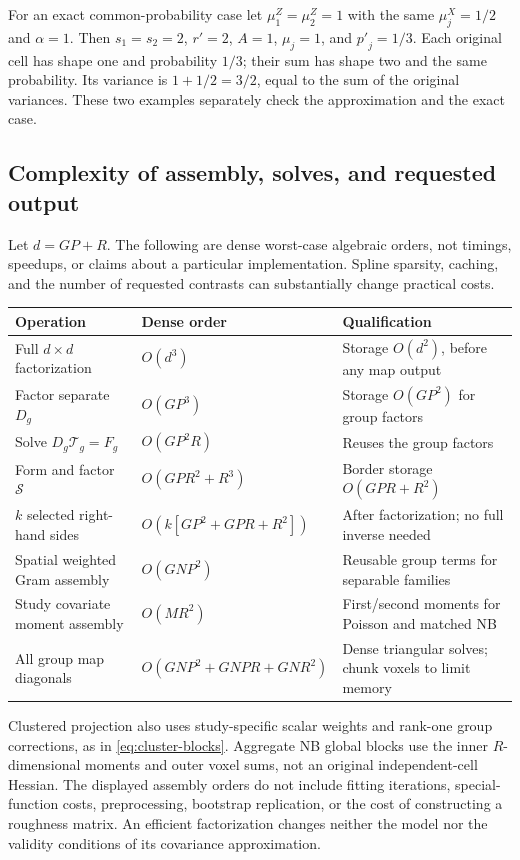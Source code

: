 \documentclass[11pt,a4paper]{article}
\numberwithin{equation}{section}
\begin{document}
For an exact common-probability case let $\mu_1^Z=\mu_2^Z=1$ with the same
$\mu_j^X=1/2$ and $\alpha=1$.
Then $s_1=s_2=2$, ${r'}=2$, $A=1$, ${\mu_j}=1$, and ${p'}_j=1/3$.
Each original cell has shape one and probability $1/3$;
their sum has shape two and the same probability.
Its variance is $1+1/2=3/2$, equal to the sum of the original variances.
These two examples separately check the approximation and the exact case.

\subsection{Complexity of assembly, solves, and requested output}
Let $d=GP+R$. The following are dense worst-case algebraic orders,
not timings, speedups, or claims about a particular implementation.
Spline sparsity, caching, and the number of requested contrasts can
substantially change practical costs.
\begin{center}\small
\begin{tabularx}{\textwidth}{T l T}
\toprule
Operation & Dense order & Qualification\\
\midrule
Full $d\times d$ factorization & $O(d^3)$ &
Storage $O(d^2)$, before any map output\\
Factor separate $D_g$ & $O(GP^3)$ &
Storage $O(GP^2)$ for group factors\\
Solve $D_g\mathcal T_g=F_g$ & $O(GP^2R)$ &
Reuses the group factors\\
Form and factor ${\mathcal S}$ & $O(GPR^2+R^3)$ &
Border storage $O(GPR+R^2)$\\
$k$ selected right-hand sides & $O(k[GP^2+GPR+R^2])$ &
After factorization; no full inverse needed\\
Spatial weighted Gram assembly & $O(GNP^2)$ &
Reusable group terms for separable families\\
Study covariate moment assembly & $O(MR^2)$ &
First/second moments for Poisson and matched NB\\
All group map diagonals & $O(GNP^2+GNPR+GNR^2)$ &
Dense triangular solves; chunk voxels to limit memory\\
\bottomrule
\end{tabularx}
\end{center}
Clustered projection also uses study-specific scalar weights and
rank-one group corrections, as in \eqref{eq:cluster-blocks}.
Aggregate NB global blocks use the inner $R$-dimensional moments and
outer voxel sums, not an original independent-cell Hessian.
The displayed assembly orders do not include fitting iterations,
special-function costs, preprocessing, bootstrap replication, or
the cost of constructing a roughness matrix.
An efficient factorization changes neither the model nor the validity
conditions of its covariance approximation.
\end{document}
